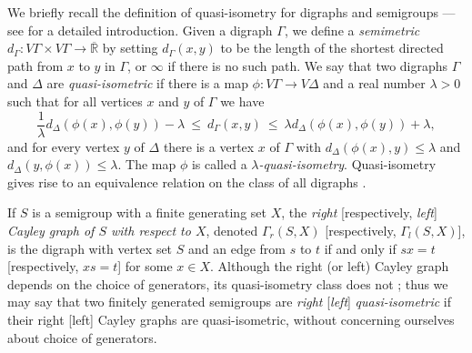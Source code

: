 \documentclass[11pt,a4paper,reqno]{amsart}
\begin{document}
We briefly recall the definition of quasi-isometry for digraphs
and semigroups --- see \cite{K_semimetric} for a detailed introduction.
Given a digraph $\Gamma$, we define a \textit{semimetric}
$d_\Gamma : V\Gamma \times V\Gamma \to \mathbb{\overline{R}}$
by setting $d_\Gamma(x,y)$ to be the length of the shortest directed path
from $x$ to $y$ in $\Gamma$,
or $\infty$ if there is no such path. We say that two digraphs $\Gamma$ and
$\Delta$ are 
\textit{quasi-isometric} if there is a map $\phi : V\Gamma \to V \Delta$
and a real number $\lambda > 0$ such that for all vertices $x$ and $y$ of $\Gamma$ we have
$$\frac{1}{\lambda} d_\Delta(\phi(x),\phi(y)) - \lambda \ \leq \ d_\Gamma(x,y) \ \leq \ \lambda d_\Delta(\phi(x),\phi(y)) + \lambda,$$
and for every vertex $y$ of $\Delta$ there is a vertex $x$ of $\Gamma$
with $d_\Delta(\phi(x),y) \leq \lambda$ and $d_\Delta(y, \phi(x)) \leq \lambda$. The map
$\phi$ is called a \textit{$\lambda$-quasi-isometry}. Quasi-isometry gives
rise to an equivalence relation on the class of all digraphs
\cite[Proposition~1]{K_semimetric}.

If $S$ is a semigroup with a finite generating set $X$, the
\textit{right} [respectively, \textit{left}] \textit{Cayley graph of $S$ with respect
to $X$}, denoted $\Gamma_r(S,X)$ [respectively, $\Gamma_l(S,X)$], is the digraph
with vertex set $S$ and an edge from $s$ to $t$ if and only if $sx = t$
[respectively, $xs = t$]
for some $x \in X$. Although the right (or left) Cayley graph depends on the choice of
generators, its quasi-isometry class does not \cite[Proposition~4]{K_semimetric};
thus we may say that two finitely generated semigroups are
\textit{right} [\textit{left}] \textit{quasi-isometric} if their right [left]
Cayley graphs are quasi-isometric, without concerning ourselves about
choice of generators.
\end{document}
